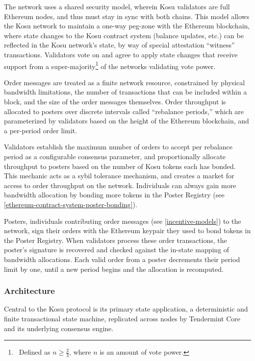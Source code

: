\documentclass[10pt]{article}
\begin{document}
The network uses a shared security model, wherein Kosu validators are full Ethereum nodes, and thus must stay in sync with both chains. This model allows the Kosu network to maintain a one-way peg-zone with the Ethereum blockchain, where state changes to the Kosu contract system (balance updates, etc.) can be reflected in the Kosu network’s state, by way of special attestation ``witness'' transactions. Validators vote on and agree to apply state changes that receive support from a super-majority\footnote{\ Defined as { $ n \geq \frac{2}{3}$}, where {$n$} is an amount of vote power\cite{tendermint-wp}.} of the networks validating vote power.
\medskip

Order messages are treated as a finite network resource, constrained by physical bandwidth limitations, the number of transactions that can be included within a block, and the size of the order messages themselves. Order throughput is allocated to posters over discrete intervals called ``rebalance periods,'' which are parameterized by validators based on the height of the Ethereum blockchain, and a per-period order limit.
\medskip

Validators establish the maximum number of orders to accept per rebalance period as a configurable consensus parameter, and proportionally allocate throughput to posters based on the number of Kosu tokens each has bonded. This mechanic acts as a sybil tolerance mechanism, and creates a market for access to order throughput on the network. Individuals can always gain more bandwidth allocation by bonding more tokens in the Poster Registry (see \ref{ethereum-contract-system-poster-bonding}).
\medskip

Posters, individuals contributing order messages (see \ref{incentive-models}) to the network, sign their orders with the Ethereum keypair they used to bond tokens in the Poster Registry. When validators process these order transactions, the poster’s signature is recovered and checked against the in-state mapping of bandwidth allocations. Each valid order from a poster decrements their period limit by one, until a new period begins and the allocation is recomputed.
\subsubsection{Architecture}\label{tm-network-architecture}
Central to the Kosu protocol is its primary state application, a deterministic and finite transactional state machine, replicated across nodes by Tendermint Core and its underlying consensus engine. 
\medskip
\end{document}
